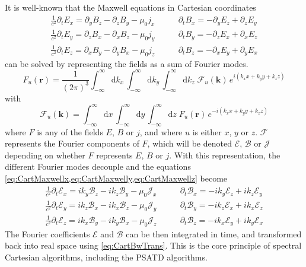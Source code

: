 \documentclass[1p,times,authoryear]{elsarticle}
\newcommand{\Integ}[1]{\int_{-\infty}^{\infty} \!\!\!\!\!\!
  \mathrm{d}#1}
\renewcommand{\vec}[1]{\boldsymbol{#1}}
\begin{document}
It is well-known that the Maxwell equations in Cartesian coordinates 
\begin{align}
\frac{1}{c^2}\partial_t E_x = \partial_y B_z - \partial_z B_y - \mu_0  j_x \qquad&   
\partial_t B_x = -\partial_y E_z + \partial_z E_y \label{eq:CartMaxwellx} \\
\frac{1}{c^2}\partial_t E_y = \partial_z B_x - \partial_x B_z - \mu_0  j_y \qquad &   
\partial_t B_y = -\partial_z E_x + \partial_x E_z \label{eq:CartMaxwelly}  \\
\frac{1}{c^2}\partial_t E_z = \partial_x B_y - \partial_y B_x - \mu_0  j_z \qquad &   
\partial_t B_z = -\partial_x E_y + \partial_y E_x \label{eq:CartMaxwellz} 
\end{align}
can be solved by representing the fields as a sum of Fourier modes.
\begin{equation}
\label{eq:CartBwTrans}
F_u(\vec{r}) = \frac{1}{(2\pi)^{3}}\Integ{k_x} \,\Integ{k_y}\,
\Integ{k_z} \; \mathcal{F}_u(\vec{k}) \, e^{i(k_x x + k_y y + k_z z)} 
\end{equation}
with 
\begin{equation}
\label{eq:CartFwTrans}
\mathcal{F}_u(\vec{k})  = \Integ{x} \,\Integ{y}\, \Integ{z} \;
F_u(\vec{r}) \, e^{-i(k_x x + k_y y + k_z z)} 
\end{equation}
where $F$ is any of the fields $E$, $B$ or $j$, and where $u$ is
either $x$, $y$ or $z$. $\mathcal{F}$ represents the Fourier
components of $F$, which will be denoted
$\mathcal{E}$, $\mathcal{B}$ or $\mathcal{J}$ depending on whether
$F$ represents $E$, $B$ or $j$. With this representation, the
different Fourier modes decouple and the equations 
\cref{eq:CartMaxwellx,eq:CartMaxwelly,eq:CartMaxwellz} become 
\begin{align}
\frac{1}{c^2}\partial_t \mathcal{E}_x = ik_y \mathcal{B}_z - ik_z \mathcal{B}_y - \mu_0 \mathcal{J}_x \qquad &   
\partial_t \mathcal{B}_x = -ik_y \mathcal{E}_z + ik_z \mathcal{E}_y \label{eq:CartSpectMaxwellx}\\
\frac{1}{c^2}\partial_t \mathcal{E}_y = ik_z \mathcal{B}_x - ik_x \mathcal{B}_z - \mu_0  \mathcal{J}_y \qquad &   
\partial_t \mathcal{B}_y = -ik_z \mathcal{E}_x + ik_x \mathcal{E}_z \label{eq:CartSpectMaxwelly}\\
\frac{1}{c^2}\partial_t \mathcal{E}_z = ik_x \mathcal{B}_y - ik_y \mathcal{B}_x - \mu_0 \mathcal{J}_z  \qquad &   
\partial_t \mathcal{B}_z = -ik_x \mathcal{E}_y + ik_y \mathcal{E}_x \label{eq:CartSpectMaxwellz}
\end{align}
The Fourier coefficients $\mathcal{E}$ and $\mathcal{B}$ can be then integrated in time, and
transformed back into real space using \cref{eq:CartBwTrans}. This is
the core principle of spectral Cartesian algorithms, including the PSATD algorithms.
\end{document}

